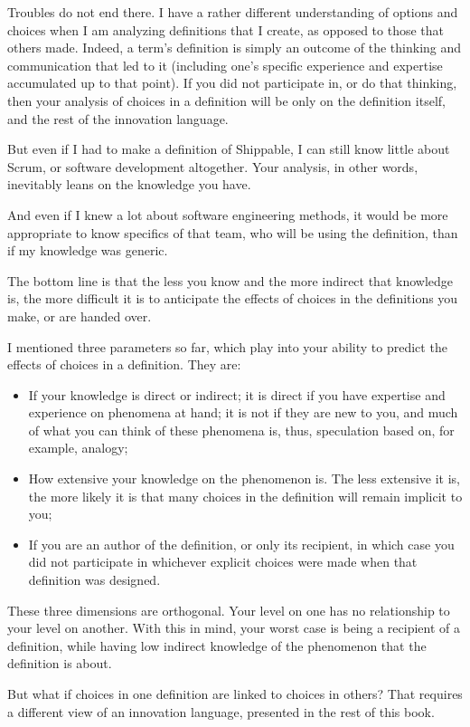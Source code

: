 Troubles do not end there. I have a rather different understanding of options and choices when I am analyzing definitions that I create, as opposed to those that others made. Indeed, a term's definition is simply an outcome of the thinking and communication that led to it (including one's specific experience and expertise accumulated up to that point). If you did not participate in, or do that thinking, then your analysis of choices in a definition will be only on the definition itself, and the rest of the innovation language.

But even if I had to make a definition of Shippable, I can still know little about Scrum, or software development altogether. Your analysis, in other words, inevitably leans on the knowledge you have.

And even if I knew a lot about software engineering methods, it would be more appropriate to know specifics of that team, who will be using the definition, than if my knowledge was generic.

The bottom line is that the less you know and the more indirect that knowledge is, the more difficult it is to anticipate the effects of choices in the definitions you make, or are handed over.

I mentioned three parameters so far, which play into your ability to predict the effects of choices in a definition. They are:
\begin{itemize}
	\item If your knowledge is direct or indirect; it is direct if you have expertise and experience on phenomena at hand; it is not if they are new to you, and much of what you can think of these phenomena is, thus, speculation based on, for example, analogy;
	\item How extensive your knowledge on the phenomenon is. The less extensive it is, the more likely it is that many choices in the definition will remain implicit to you;
	\item If you are an author of the definition, or only its recipient, in which case you did not participate in whichever explicit choices were made when that definition was designed.
\end{itemize}

These three dimensions are orthogonal. Your level on one has no relationship to your level on another. With this in mind, your worst case is being a recipient of a definition, while having low indirect knowledge of the phenomenon that the definition is about.

But what if choices in one definition are linked to choices in others? That requires a different view of an innovation language, presented in the rest of this book.


\printbibliography